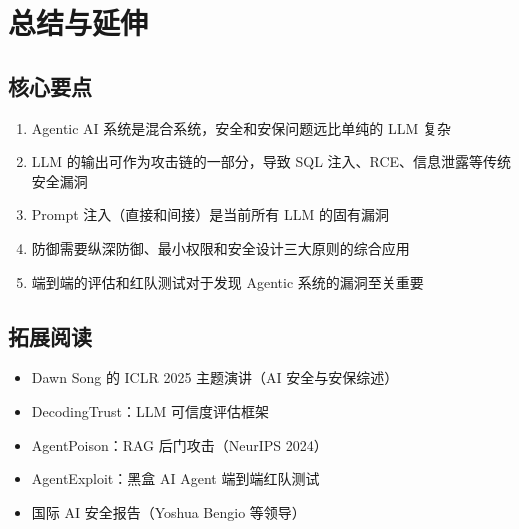 \section{总结与延伸}

\subsection{核心要点}

\begin{enumerate}
    \item Agentic AI 系统是混合系统，安全和安保问题远比单纯的 LLM 复杂
    \item LLM 的输出可作为攻击链的一部分，导致 SQL 注入、RCE、信息泄露等传统安全漏洞
    \item Prompt 注入（直接和间接）是当前所有 LLM 的固有漏洞
    \item 防御需要纵深防御、最小权限和安全设计三大原则的综合应用
    \item 端到端的评估和红队测试对于发现 Agentic 系统的漏洞至关重要
\end{enumerate}

\subsection{拓展阅读}
\begin{itemize}
    \item Dawn Song 的 ICLR 2025 主题演讲（AI 安全与安保综述）
    \item DecodingTrust：LLM 可信度评估框架
    \item AgentPoison：RAG 后门攻击（NeurIPS 2024）
    \item AgentExploit：黑盒 AI Agent 端到端红队测试
    \item 国际 AI 安全报告（Yoshua Bengio 等领导）
\end{itemize}



